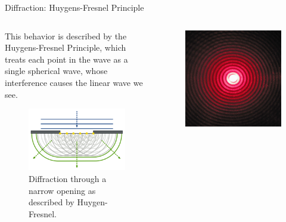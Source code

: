 \documentclass{beamer}
\begin{document}
\begin{frame}{Diffraction: Huygens-Fresnel Principle}
    \begin{columns}[T]
        \begin{column}{.45\textwidth}
            This behavior is described by the \alert{Huygens-Fresnel Principle}, which treats each point in the wave as a single spherical wave, whose interference causes the linear wave we see. 
            \begin{figure}
                \centering
                \includegraphics[scale=.05]{huygens.png}
                \caption{Diffraction through a narrow opening as described by Huygen-Fresnel.}
                \label{fig:huygens_diff}
            \end{figure}
        \end{column}
         \begin{column}{.45\textwidth}
           \begin{figure}
               \centering
               \includegraphics[scale=.26]{laserdiffraction.jpg}

\end{figure}
\end{column}
\end{columns}
\end{frame}
\end{document}

